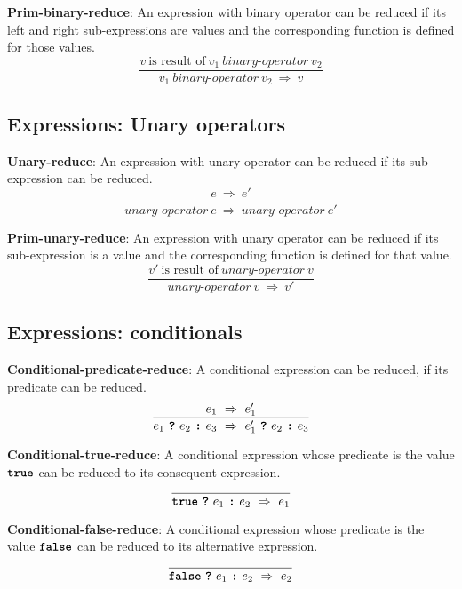 \vspace{10mm}
\textbf{Prim-binary-reduce}: An expression with binary operator
can be reduced if its left and right sub-expressions are values and
the corresponding function is defined for those values.
\[
\frac{
  v\ \mbox{is result of}\ v_1\  \textit{binary-operator} \ v_2
}{
  v_1\  \textit{binary-operator} \ v_2
  \ \Rightarrow \ 
  v
}
\]

\subsection*{Expressions: Unary operators}

\textbf{Unary-reduce}: An expression with unary operator
can be reduced if its sub-expression can be reduced.
\[
\frac{
  e \ \Rightarrow \ e'
}{
  \textit{unary-operator} \ e
  \ \Rightarrow \ 
  \textit{unary-operator} \ e'
}
\]

\vspace{10mm}
\textbf{Prim-unary-reduce}: An expression with unary operator
can be reduced if its sub-expression is a value and
the corresponding function is defined for that value.
\[
\frac{
  v'\ \mbox{is result of}\ \textit{unary-operator} \ v
}{
  \textit{unary-operator} \ v
  \ \Rightarrow \ 
  v'
}
\]

\subsection*{Expressions: conditionals}

\textbf{Conditional-predicate-reduce}: A conditional
expression can be reduced, if its predicate can be reduced.
\[
\frac{
  e_1 \ \Rightarrow \ e_1'
}{
  e_1\  \textbf{\texttt{?}}\ e_2\ \textbf{\texttt{:}}\ e_3
  \ \Rightarrow \ 
  e_1'\ \textbf{\texttt{?}}\ e_2\ \textbf{\texttt{:}}\ e_3
}
\]

\vspace{10mm}
\textbf{Conditional-true-reduce}: A conditional
expression whose predicate is the value
$\textbf{\texttt{true}}$
can be reduced to its consequent expression.
\[
\frac{
}{
  \textbf{\texttt{true}}\  \textbf{\texttt{?}}\ e_1\ \textbf{\texttt{:}}\ e_2
  \ \Rightarrow \ 
  e_1
}
\]

\vspace{10mm}
\textbf{Conditional-false-reduce}: A conditional
expression whose predicate is the value
$\textbf{\texttt{false}}$
can be reduced to its alternative expression.
\[
\frac{
}{
  \textbf{\texttt{false}}\  \textbf{\texttt{?}}\ e_1\ \textbf{\texttt{:}}\ e_2
  \ \Rightarrow \ 
  e_2
}
\]


